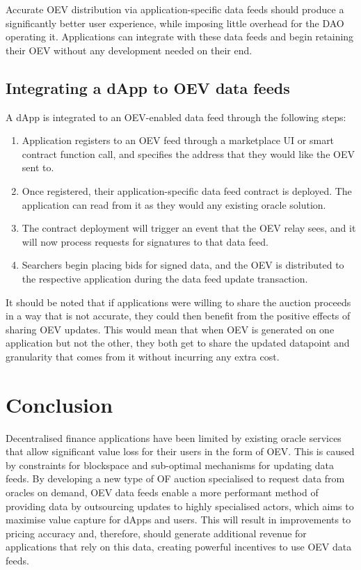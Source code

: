 \documentclass[11pt]{article}
\begin{document}
Accurate OEV distribution via application-specific data feeds should produce a significantly better user experience, while imposing little overhead for the DAO operating it.
Applications can integrate with these data feeds and begin retaining their OEV without any development needed on their end.

\subsection{Integrating a dApp to OEV data feeds}

A dApp is integrated to an OEV-enabled data feed through the following steps:

\begin{enumerate}
	\item Application registers to an OEV feed through a marketplace UI or smart contract function call, and specifies the address that they would like the OEV sent to.
	\item Once registered, their application-specific data feed contract is deployed. The application can read from it as they would any existing oracle solution.
	\item The contract deployment will trigger an event that the OEV relay sees, and it will now process requests for signatures to that data feed.
	\item Searchers begin placing bids for signed data, and the OEV is distributed to the respective application during the data feed update transaction.
\end{enumerate}

It should be noted that if applications were willing to share the auction proceeds in a way that is not accurate, they could then benefit from the positive effects of sharing OEV updates.
This would mean that when OEV is generated on one application but not the other, they both get to share the updated datapoint and granularity that comes from it without incurring any extra cost.

\section{Conclusion}
\label{sec:conclusion}

Decentralised finance applications have been limited by existing oracle services that allow significant value loss for their users in the form of OEV.
This is caused by constraints for blockspace and sub-optimal mechanisms for updating data feeds.
By developing a new type of OF auction specialised to request data from oracles on demand, OEV data feeds enable a more performant method of providing data by outsourcing updates to highly specialised actors, which aims to maximise value capture for dApps and users.
This will result in improvements to pricing accuracy and, therefore, should generate additional revenue for applications that rely on this data, creating powerful incentives to use OEV data feeds.
\end{document}
